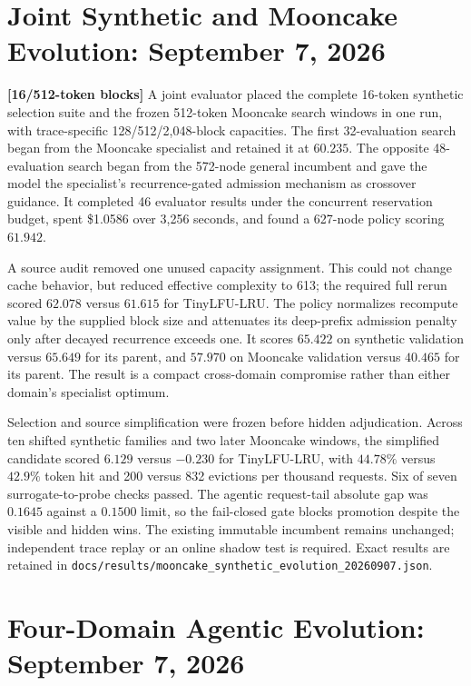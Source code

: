 \documentclass[11pt]{article}
\newcommand{\filepath}[1]{\nolinkurl{#1}}
\newcommand{\blocktag}[1]{\textbf{\color{navy}[#1-token blocks]}}
\begin{document}
\section{Joint Synthetic and Mooncake Evolution: September 7, 2026}

\blocktag{16/512} A joint evaluator placed the complete 16-token synthetic
selection suite and the frozen 512-token Mooncake search windows in one run,
with trace-specific 128/512/2,048-block capacities.  The first 32-evaluation
search began from the Mooncake specialist and retained it at $60.235$.  The
opposite 48-evaluation search began from the 572-node general incumbent and
gave the model the specialist's recurrence-gated admission mechanism as
crossover guidance.  It completed 46 evaluator results under the concurrent
reservation budget, spent \$1.0586 over 3,256 seconds, and found a 627-node
policy scoring $61.942$.

A source audit removed one unused capacity assignment.  This could not change
cache behavior, but reduced effective complexity to 613; the required full
rerun scored $62.078$ versus $61.615$ for TinyLFU-LRU.  The policy normalizes
recompute value by the supplied block size and attenuates its deep-prefix
admission penalty only after decayed recurrence exceeds one.  It scores
$65.422$ on synthetic validation versus $65.649$ for its parent, and $57.970$
on Mooncake validation versus $40.465$ for its parent.  The result is a compact
cross-domain compromise rather than either domain's specialist optimum.

Selection and source simplification were frozen before hidden adjudication.
Across ten shifted synthetic families and two later Mooncake windows, the
simplified candidate scored $6.129$ versus $-0.230$ for TinyLFU-LRU, with
$44.78\%$ versus $42.9\%$ token hit and 200 versus 832 evictions per thousand
requests.  Six of seven surrogate-to-probe checks passed.  The agentic
request-tail absolute gap was $0.1645$ against a $0.1500$ limit, so the
fail-closed gate blocks promotion despite the visible and hidden wins.  The
existing immutable incumbent remains unchanged; independent trace replay or an
online shadow test is required.  Exact results are retained in
\filepath{docs/results/mooncake\_synthetic\_evolution\_20260907.json}.

\section{Four-Domain Agentic Evolution: September 7, 2026}
\end{document}
